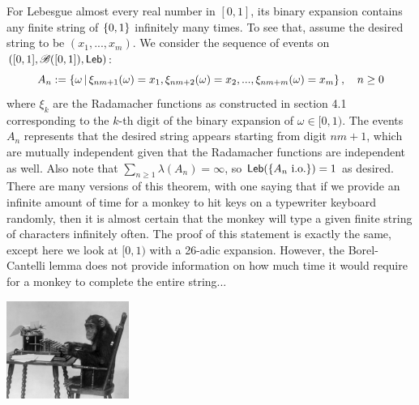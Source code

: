 \begin{example}
For Lebesgue almost every real number in $[0,1]$, its binary expansion contains any finite string of $\left\{ 0,1 \right \}$ infinitely many times. To see that, assume the desired string to be $(x_1,...,x_m)$. We consider the sequence of events on $([0,1], \mathcal{B}([0,1]), \mathsf{Leb})$:
\begin{equation*}
A_n := \left\{ \omega \,|\, \xi_{nm+1}(\omega) = x_1, \xi_{nm+2}(\omega) = x_2, ..., \xi_{nm+m}(\omega) = x_m \right \}, \quad n \geq 0
\end{equation*}
where $\xi_k$ are the Radamacher functions as constructed in section 4.1 corresponding to the $k$-th digit of the binary expansion of $\omega \in [0,1)$. The events $A_n$ represents that the desired string appears starting from digit $nm+1$, which are mutually independent given that the Radamacher functions are independent as well. Also note that $\sum_{n\geq 1} \lambda(A_n) = \infty$, so $\mathsf{Leb}(\left\{ A_n \text{ i.o.} \right \}) = 1$ as desired. \\

There are many versions of this theorem, with one saying that if we provide an infinite amount of time for a monkey to hit keys on a typewriter keyboard randomly, then it is almost certain that the monkey will type a given finite string of characters infinitely often. The proof of this statement is exactly the same, except here we look at $[0,1)$ with a 26-adic expansion. However, the Borel-Cantelli lemma does not provide information on how much time it would require for a monkey to complete the entire string...

\begin{center}
\includegraphics[width=0.3\textwidth]{figures/chimpanzee.jpg}
\end{center}
\end{example}
\newpage 

